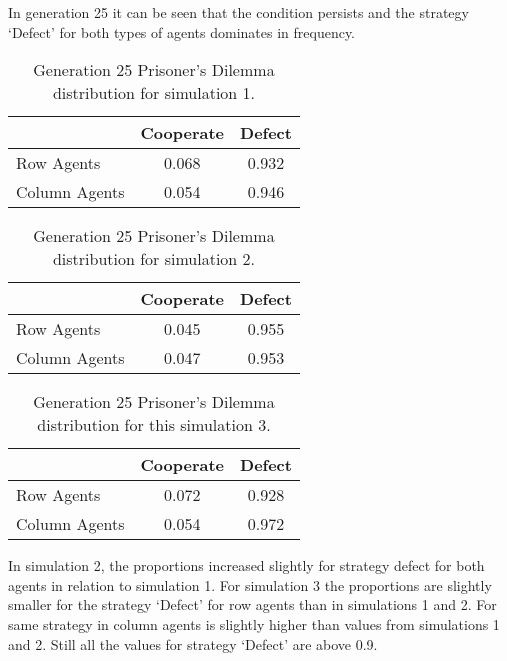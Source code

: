 \documentclass{book}
\begin{document}
In generation 25 it can be seen that the condition persists and the strategy `Defect' for both types of agents dominates in frequency.
\begin{table}[H]
\begin{center}
\begin{tabular}{|l|c|c|}
\hline
& Cooperate & Defect \\ 
\hline
Row Agents & 0.068 & 0.932\\
\hline
Column Agents & 0.054 & 0.946\\
\hline
\end{tabular}
\end{center}
\caption{Generation 25 Prisoner’s Dilemma distribution for simulation 1.}
\label{tab:pds1g25}
\end{table}

\begin{table}[H]
\begin{center}
\begin{tabular}{|l|c|c|}
\hline
& Cooperate & Defect \\ 
\hline
Row Agents & 0.045 & 0.955\\
\hline
Column Agents & 0.047 & 0.953\\
\hline
\end{tabular}
\end{center}
\caption{Generation 25 Prisoner’s Dilemma distribution for simulation 2.}
\label{tab:pds2g25}
\end{table}

\begin{table}[H]
\begin{center}
\begin{tabular}{|l|c|c|}
\hline
& Cooperate & Defect \\ 
\hline
Row Agents & 0.072 & 0.928\\
\hline
Column Agents & 0.054 & 0.972\\
\hline
\end{tabular}
\end{center}
\caption{Generation 25 Prisoner’s Dilemma distribution for this simulation 3.}
\label{tab:pds3g25}
\end{table}


In simulation 2, the proportions increased slightly for strategy defect for both agents in relation to simulation 1. For simulation 3 the proportions are slightly smaller for the strategy `Defect' for row agents than in simulations 1 and 2. For same strategy in column agents is slightly higher than values from simulations 1 and 2. Still all the values for strategy `Defect' are above 0.9.
\end{document}
